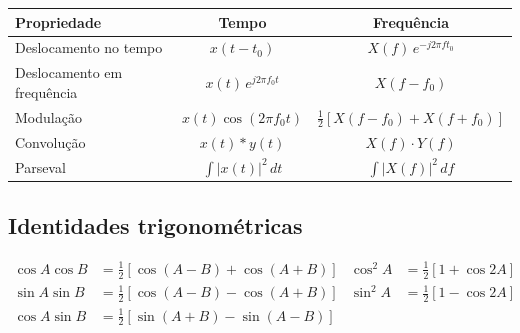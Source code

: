 \documentclass[11pt,a4paper]{article}
\begin{document}
\renewcommand{\arraystretch}{1.4}
\begin{center}
\begin{tabular}{lcc}
  \toprule
  Propriedade & Tempo & Frequência \\
  \midrule
  Deslocamento no tempo & $x(t - t_0)$ & $X(f)\,e^{-j2\pi f t_0}$ \\
  Deslocamento em frequência & $x(t)\,e^{j2\pi f_0 t}$ & $X(f - f_0)$ \\
  Modulação & $x(t)\cos(2\pi f_0 t)$ & $\frac{1}{2}[X(f{-}f_0) + X(f{+}f_0)]$ \\
  Convolução & $x(t) * y(t)$ & $X(f)\cdot Y(f)$ \\
  Parseval & $\int |x(t)|^2\,dt$ & $\int |X(f)|^2\,df$ \\
  \bottomrule
\end{tabular}
\end{center}

\subsection*{Identidades trigonométricas}
\vspace{-0.3cm}
\begin{align*}
  \cos A \cos B &= \tfrac{1}{2}[\cos(A-B) + \cos(A+B)] &
  \cos^2 A &= \tfrac{1}{2}[1 + \cos 2A] \\
  \sin A \sin B &= \tfrac{1}{2}[\cos(A-B) - \cos(A+B)] &
  \sin^2 A &= \tfrac{1}{2}[1 - \cos 2A] \\
  \cos A \sin B &= \tfrac{1}{2}[\sin(A+B) - \sin(A-B)]
\end{align*}
\end{document}
